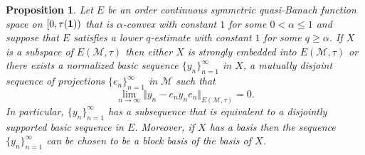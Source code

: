 \documentclass[12pt]{amsart}
\let\cal\mathcal
\newtheorem{proposition}[theorem]{Proposition}
\def\m{{\cal M}}
\numberwithin{equation}{section}
\numberwithin{theorem}{section}
\begin{document}
\begin{proposition}\label{dichotomy1}
Let $E$ be an order continuous symmetric quasi-Banach function space on
$[0,\tau({\bf 1}))$ that is $\alpha$-convex with constant $1$ for some 
$0<\alpha\leq 1$ and suppose that $E$ satisfies a lower $q$-estimate 
with constant $1$ for some $q\geq \alpha$. If $X$ is a subspace of 
$E(\m,\tau)$ then either $X$ is strongly embedded into 
$E(\m,\tau)$ or there exists a normalized basic sequence 
$\{y_n\}_{n=1}^\infty$ in $X$,
a mutually disjoint sequence of projections $\{e_n\}_{n=1}^\infty$ in $\m$ such that
$$\lim_{n\to \infty} \Vert y_n-e_ny_ne_n\Vert_{E(\m,\tau)}=0.$$
In particular, $\{y_n\}_{n=1}^\infty$ has a subsequence that is
 equivalent to a disjointly supported basic 
sequence in $E$. Moreover, if $X$ has a basis then the sequence 
$\{y_n\}_{n=1}^\infty$ can be chosen to be a block basis of the basis of $X$.
\end{proposition}
\end{document}
